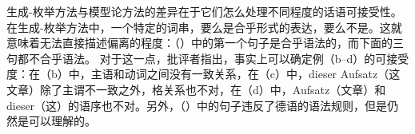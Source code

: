 生成-枚举方法与模型论方法的差异在于它们怎么处理不同程度的话语可接受性。在生成-枚举方法中，一个特定的词串，要么是合乎形式的表达，要么不是。这就意味着无法直接描述偏离的程度：（）中的第一个句子是合乎语法的，而下面的三句都不合乎语法。
\eal
{}
\zl
对于这一点，批评者指出，事实上可以确定例（b--d）的可接受度：在（b）中，主语和动词之间没有一致关系，在（c）中，dieser Aufsatz（这 文章）除了主谓不一致之外，格关系也不对，在（d）中，Aufsatz（文章）和dieser（这）的语序也不对。另外，（）中的句子违反了德语的语法规则，但是仍然是可以理解的。
